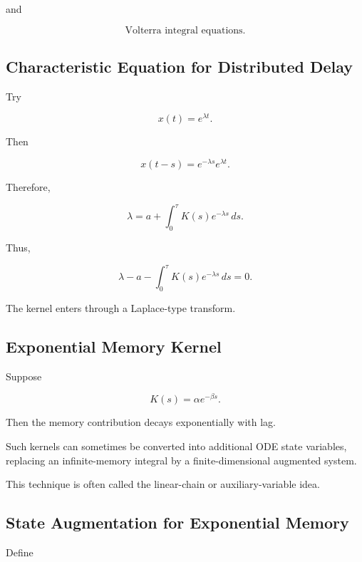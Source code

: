 and

\[
\boxed{
\text{Volterra integral equations}.
}
\]

\subsection{Characteristic Equation for Distributed Delay}
\label{subsec:distributed-delay-characteristic}

Try

\[
x(t)=e^{\lambda t}.
\]

Then

\[
x(t-s)
=
e^{-\lambda s}
e^{\lambda t}.
\]

Therefore,

\[
\lambda
=
a
+
\int_0^\tau
K(s)e^{-\lambda s}\,ds.
\]

Thus,

\[
\boxed{
\lambda
-
a
-
\int_0^\tau
K(s)e^{-\lambda s}\,ds
=
0.
}
\]

The kernel enters through a Laplace-type transform.

\subsection{Exponential Memory Kernel}
\label{subsec:exponential-memory-kernel}

Suppose

\[
K(s)
=
\alpha e^{-\beta s}.
\]

Then the memory contribution decays exponentially with lag.

Such kernels can sometimes be converted into additional ODE state
variables, replacing an infinite-memory integral by a finite-dimensional
augmented system.

This technique is often called the linear-chain or auxiliary-variable
idea.

\subsection{State Augmentation for Exponential Memory}
\label{subsec:state-augmentation-memory}

Define

